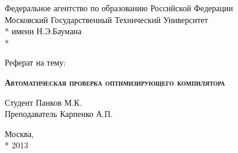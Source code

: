\begin{titlepage}
    \newpage
    
    \begin{center}
        Федеральное агентство по образованию Российской Федерации \\
        Московский Государственный Технический Университет \\*
        имени Н.Э.Баумана \\*
        \vspace{-12mm}
        \begin{figure}[h]
        \end{figure}
        \vspace{-16mm}
        \hrulefill
    \end{center}
    \begin{center}
        \Large Реферат на тему:
    \end{center}
    
    \vspace{2.5em}
    
    \begin{center}
        \textsc{\textbf{Автоматическая проверка оптимизирующего компилятора}}
    \end{center}
    
    \vspace{6em}
    
    \begin{flushleft}
        \hspace{8.5cm}Студент \hrulefill Панков М.К. \\
        \vspace{1.5em}
        \hspace{8.5cm}Преподаватель \hrulefill Карпенко А.П.\\
    \end{flushleft}
    
    \vspace{\fill}
    
    \begin{center}
        Москва, \\*
        2013
    \end{center}

\end{titlepage}